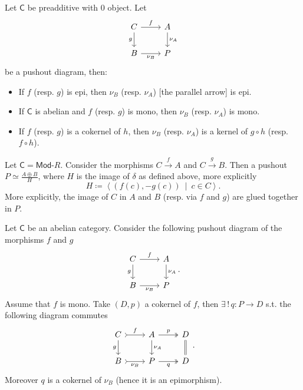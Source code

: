 \begin{prop}
	Let $\mathsf{C}$ be preadditive with $0$ object.
	Let 
	\begin{equation}
	\begin{tikzcd}
		C \arrow[r, "f", rightarrow] \arrow[d, "g"', rightarrow] &
		A \arrow[d, "\nu_A", rightarrow] \\
		B \arrow[r, "\nu_B"', rightarrow] & P
	\end{tikzcd}
	\end{equation} 
	be a pushout diagram, then:
	\begin{itemize}
		\item If $f$ (resp. $g$) is epi, then $\nu_B$ (resp. $\nu_A$) [the parallel arrow] is epi.
		\item If $\mathsf{C}$ is abelian and $f$ (resp. $g$) is mono, then $\nu_B$ (resp. $\nu_A$) is mono.
		\item If $f$ (resp. $g$) is a cokernel of $h$, then $\nu_B$ (resp. $\nu_A$) is a kernel of $g \circ h$ (resp. $f \circ h$).
	\end{itemize}
\end{prop} 

\begin{ex}
	Let $\mathsf{C} = \mathsf{Mod}\text{-}R$.
	Consider the morphisms $C \xrightarrow{f} A$ and $C \xrightarrow{g} B$.
	Then a pushout $P \simeq \frac{A \oplus B}{H}$, where $H$ is the image of $\delta$ as defined above, more explicitly
	\begin{equation}
		H \coloneqq \left\langle \left(f(c), -g(c)\right) \ \middle|\ c \in C \right\rangle
	.\end{equation} 
	More explicitly, the image of $C$ in $A$ and $B$ (resp. via $f$ and $g$) are glued together in $P$.
\end{ex} 

\begin{ex}
	Let $\mathsf{C}$ be an abelian category.
	Consider the following pushout diagram of the morphisms $f$ and $g$ 
	\begin{equation}
	\begin{tikzcd}
		C \arrow[r, "f", rightarrow] \arrow[d, "g"', rightarrow] &
		A \arrow[d, "\nu_A", rightarrow] \\
		B \arrow[r, "\nu_B"', rightarrow] &
		P
	\end{tikzcd}
	.\end{equation} 
	Assume that $f$ is mono.
	Take $\left(D, p\right)$ a cokernel of $f$, then $\exists\, !\, q\colon P \to D$ s.t. the following diagram commutes
	\begin{equation}
	\begin{tikzcd}
		C \arrow[r, "f", tail] \arrow[d, "g"', rightarrow] &
		A \arrow[r, "p", twoheadrightarrow] \arrow[d, "\nu_A", rightarrow] &
		D \arrow[d, "", equal] \\
		B \arrow[r, "\nu_B"', tail] &
		P \arrow[r, "q"', twoheadrightarrow] &
		D
	\end{tikzcd}
	.\end{equation} 
	Moreover $q$ is a cokernel of $\nu_B$ (hence it is an epimorphism).
\end{ex} 
